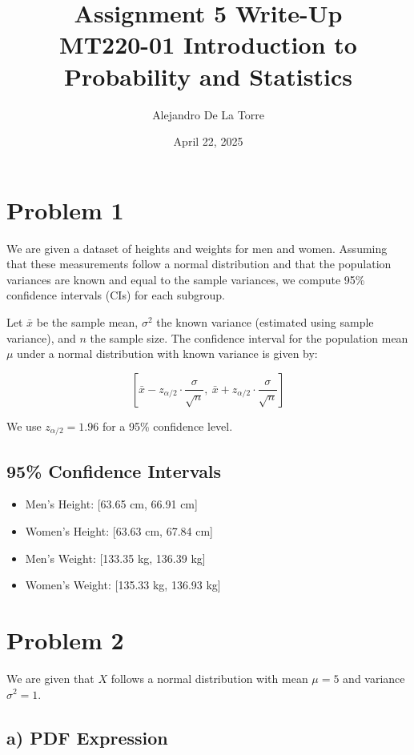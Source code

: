 \documentclass[12pt]{article}
\title{Assignment 5 Write-Up \\ MT220-01 Introduction to Probability and Statistics}
\author{Alejandro De La Torre}
\date{April 22, 2025}
\begin{document}
\maketitle

\section*{Problem 1}

We are given a dataset of heights and weights for men and women. Assuming that these measurements follow a normal distribution and that the population variances are known and equal to the sample variances, we compute 95\% confidence intervals (CIs) for each subgroup.

Let $\bar{x}$ be the sample mean, $\sigma^2$ the known variance (estimated using sample variance), and $n$ the sample size. The confidence interval for the population mean $\mu$ under a normal distribution with known variance is given by:

\[
\left[ \bar{x} - z_{\alpha/2} \cdot \frac{\sigma}{\sqrt{n}},\ \bar{x} + z_{\alpha/2} \cdot \frac{\sigma}{\sqrt{n}} \right]
\]

We use $z_{\alpha/2} = 1.96$ for a 95\% confidence level.

\vspace{1em}
\subsection*{95\% Confidence Intervals}
\begin{itemize}
  \item Men's Height: [63.65 cm, 66.91 cm]
  \item Women's Height: [63.63 cm, 67.84 cm]
  \item Men's Weight: [133.35 kg, 136.39 kg]
  \item Women's Weight: [135.33 kg, 136.93 kg]

\end{itemize}


\section*{Problem 2}

We are given that $X$ follows a normal distribution with mean $\mu = 5$ and variance $\sigma^2 = 1$.

\subsection*{a) PDF Expression}
\end{document}
